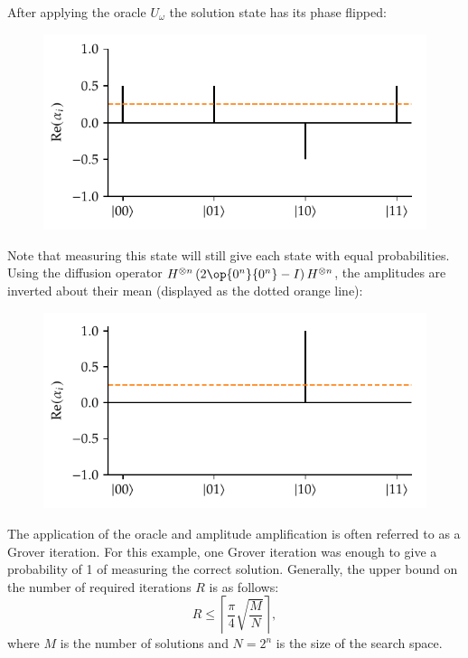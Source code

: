 \noindent
After applying the oracle $U_\omega$ the solution state  has its phase flipped:
\begin{figure}[H]
    \centering
    \includegraphics[width=0.525\linewidth]{figures/aa_phase_flipped_mean.pdf}
\end{figure}

\noindent
Note that measuring this state will still give each state with equal probabilities.
Using the diffusion operator $H^{\otimes n}\left(2\op{0^n}{0^n} - I\right)H^{\otimes n}$, the amplitudes are inverted about their mean (displayed as the dotted orange line):
\begin{figure}[H]
    \centering
    \includegraphics[width=0.525\linewidth]{figures/aa_diffused.pdf}
\end{figure}

\noindent
The application of the oracle and amplitude amplification is often referred to as a Grover iteration.
For this example, one Grover iteration was enough to give a probability of 1 of measuring the correct solution.
Generally, the upper bound on the number of required iterations $R$ is as follows:
\begin{equation}
R \leq \left\lceil \dfrac{\pi}{4}\sqrt{\dfrac{M}{N}} \right\rceil,
\end{equation}
where $M$ is the number of solutions and $N = 2^n$ is the size of the search space.
